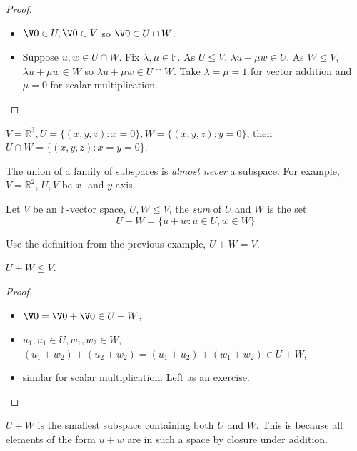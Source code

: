 \documentclass[a4paper]{article}
\theoremstyle{definition}
\begin{document}
\begin{proof}\leavevmode
  \begin{itemize}
  \item $\V 0 \in U, \V 0 \in V$ so $\V 0 \in U \cap W$.
    \item Suppose $u, w \in U \cap W$. Fix $\lambda, \mu \in \mathbb{F}$. As $U \leq V$, $\lambda u + \mu w \in U$. As $W \leq V$, $\lambda u +\mu w \in W$ so $\lambda u + \mu w \in U \cap W$. Take $\lambda = \mu = 1$ for vector addition and $\mu = 0$ for scalar multiplication.
  \end{itemize}
\end{proof}

\begin{eg}
  $V = \mathbb{R}^3, U = \{(x,y,z): x=0\}, W=\{(x,y,z):y=0\}$, then $U\cap W=\{(x,y,z):x=y=0\}$.
\end{eg}

\begin{note}
The union of a family of subspaces is \emph{almost never} a subspace. For example, $V = \mathbb{R}^2$, $U, V$ be $x$- and $y$-axis.
\end{note}

\begin{defi}
  Let $V$ be an $\mathbb{F}$-vector space, $U, W \leq V$, the \emph{sum} of $U$ and $W$ is the set
  \[
    U + W = \{u+w: u\in U, w\in W\}
  \]
\end{defi}

\begin{eg}
  Use the definition from the previous example, $U+W=V$.
\end{eg}

\begin{prop}
  $U+W \leq V$.
\end{prop}

\begin{proof}\leavevmode
  \begin{itemize}
  \item $\V 0 = \V 0 + \V 0 \in U+W$,
  \item $u_1,u_1\in U, w_1,w_2\in W$, $(u_1+w_2) + (u_2+w_2) = (u_1+u_2)+(w_1+w_2) \in U+W$,
    \item similar for scalar multiplication. Left as an exercise.
  \end{itemize}
\end{proof}

\begin{note}
  $U+W$ is the smallest subspace containing both $U$ and $W$. This is because all elements of the form $u+w$ are in such a space by closure under addition.
\end{note}
\end{document}
